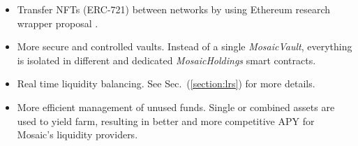 \begin{itemize}
    \item Transfer NFTs (ERC-721) between networks by using Ethereum research wrapper proposal \cite{WhyPropertiesb}.
    \item More secure and controlled vaults. Instead of a single \textit{MosaicVault}, everything is isolated in different and dedicated \textit{MosaicHoldings} smart contracts.
    \item Real time liquidity balancing. See Sec.~(\ref{section:lrs}) for more details.
    \item More efficient management of unused funds. Single or combined assets are used to yield farm, resulting in better and more competitive APY for Mosaic's liquidity providers.
\end{itemize}

